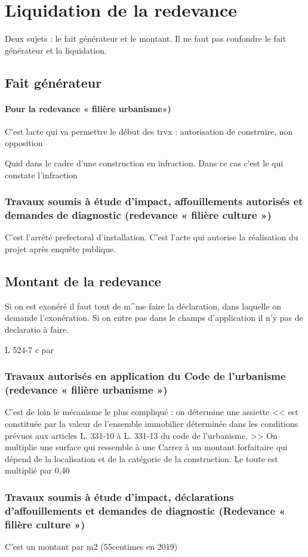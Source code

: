 \section{Liquidation de la redevance}

  Deux sujets : le fait générateur et le montant. Il ne faut pas confondre le fait générateur et la liquidation.

  \subsection{Fait générateur}

    \paragraph{Pour la redevance « filière urbanisme»)}
      C'est lacte qui va permettre le début des trvx : autorisation de construire, non opposition \etc

      Quid dans le cadre d'une construction en infraction. Dans ce cas c'est le \PV qui constate l'infraction

    \subsubsection{Travaux soumis à étude d'impact, affouillements autorisés et demandes de diagnostic (redevance « filière culture »)}

      C'est l'arrêté prefectoral d'installation. C'est l'acte qui autorise la réalisation du projet après enquête publique.

  \subsection{Montant de la redevance}

    Si on est exonéré il faut tout de m^me faire la déclaration, dans laquelle on demande l'exonération. Si on entre pas dans le champs d'application il n'y pas de declaratio à faire.

    L 524-7 c par

    \subsubsection{Travaux autorisés en application du Code de l'urbanisme (redevance « filière urbanisme »)}

      C'est de loin le mécanisme le plus compliqué : on détermine une assiette << est constituée par la valeur de l'ensemble immobilier déterminée dans les conditions prévues aux articles L. 331-10 à L. 331-13 du code de l'urbanisme. >> On multiplie une surface qui ressemble à une Carrez à un montant forfaitaire qui dépend de la localisation et de la catégorie de la construction.
      Le toute est multiplié par 0,40

    \subsubsection{Travaux soumis à étude d'impact, déclarations d'affouillements et demandes de diagnostic (Redevance « filière culture »)}

      C'est un montant par m2 (55centimes en 2019)
